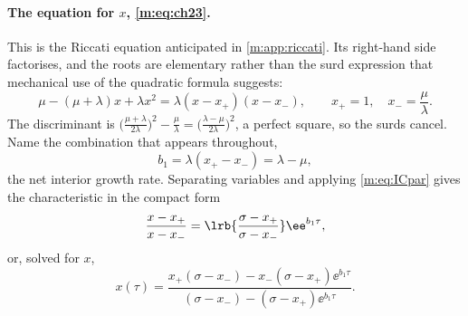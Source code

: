 \paragraph{The equation for $x$, \eqref{m:eq:ch23}.}
This is the Riccati equation anticipated in \cref{m:app:riccati}. Its right-hand
side factorises, and the roots are elementary rather than the surd expression that
mechanical use of the quadratic formula suggests:
\begin{equation}
\label{m:eq:xpm}
\mu-(\mu+\lambda)x+\lambda x^2 = \lambda(x-x_+)(x-x_-),
\qquad
x_+ = 1,\quad x_- = \frac{\mu}{\lambda} .
\end{equation}
The discriminant is
$\bigl(\tfrac{\mu+\lambda}{2\lambda}\bigr)^2-\tfrac{\mu}{\lambda}
= \bigl(\tfrac{\lambda-\mu}{2\lambda}\bigr)^2$, a perfect square, so the surds
cancel. Name the combination that appears throughout,
\begin{equation}
\label{m:eq:b1}
b_1 = \lambda(x_+-x_-) = \lambda-\mu ,
\end{equation}
the net interior growth rate. Separating variables and applying \cref{m:eq:ICpar}
gives the characteristic in the compact form
\begin{equation}
\label{m:eq:xratio}
\frac{x-x_+}{x-x_-} = \lrb{\frac{\sigma-x_+}{\sigma-x_-}}\ee^{b_1\tau},
\end{equation}
or, solved for $x$,
\begin{equation}
\label{m:eq:xabd}
x(\tau) = \frac{x_+(\sigma-x_-) - x_-(\sigma-x_+)\ee^{b_1\tau}}
{(\sigma-x_-) - (\sigma-x_+)\ee^{b_1\tau}} .
\end{equation}

